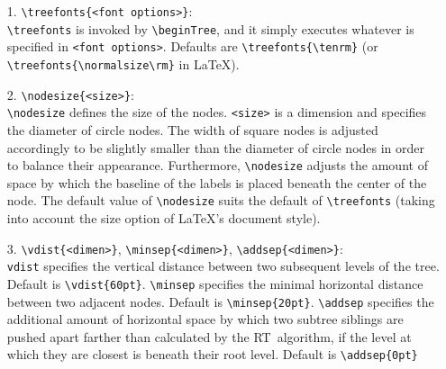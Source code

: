 \begin{enumerate}                                                               
\item[1.] \verb.\treefonts{<font options>}.:\\                                  
     \sloppy                                                                    
     \verb.\treefonts. is invoked by \verb.\beginTree., and it simply executes  
     whatever is specified in \verb.<font options>.. Defaults are               
     \verb.\treefonts{\tenrm}. (or \verb.\treefonts{\normalsize\rm}. in         
     \LaTeX).                                                                   
                                                                                
\fussy                                                                          
\item[2.] \verb.\nodesize{<size>}.:\\                                           
     \verb.\nodesize. defines the size of the nodes. \verb.<size>. is a         
     dimension and specifies the diameter of circle nodes. The                  
     width of square nodes is adjusted accordingly to be slightly               
     smaller than the diameter of circle nodes in order to                      
     balance their appearance. Furthermore,                                     
     \verb.\nodesize. adjusts the amount of space by which the                  
     baseline of the labels is placed beneath the center of the node.           
     The default value of \verb.\nodesize. suits the default of                 
     \verb.\treefonts. (taking into account the size option                     
     of \LaTeX's document style).                                               
                                                                                
\item[3.] \verb.\vdist{<dimen>}., \verb.\minsep{<dimen>}.,                      
     \verb.\addsep{<dimen>}.:\\                                                 
     \sloppy                                                                    
     \verb.vdist. specifies the vertical distance between two                   
     subsequent levels of the tree. Default is \verb.\vdist{60pt}..             
     \verb.\minsep. specifies the minimal horizontal distance between two       
     adjacent nodes. Default is \verb.\minsep{20pt}..                           
     \verb.\addsep. specifies the additional amount of horizontal space         
     by which two subtree siblings are pushed apart farther than                
     calculated by the RT~algorithm,                                            
     if the level at which they are closest is beneath                          
     their root level. Default is \verb.\addsep{0pt}.                           
                                                                                

\end{enumerate}
